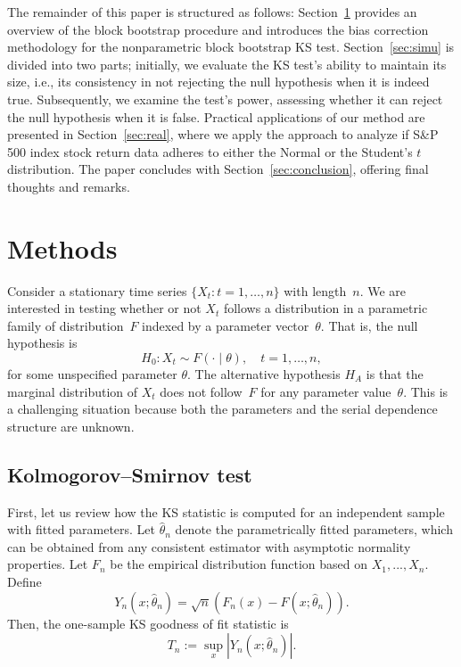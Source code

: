\documentclass[APA,Times1COL]{WileyNJDv5} %
\begin{document}
The remainder of this paper is structured as follows: 
Section~\ref{sec:methods} provides an overview of the block bootstrap 
procedure and introduces the bias correction methodology for the 
nonparametric block bootstrap KS test. Section~\ref{sec:simu} is divided 
into two parts; initially, we evaluate the KS test's ability to maintain 
its size, i.e., its consistency in not rejecting the null hypothesis when 
it is indeed true. Subsequently, we examine the test's power, assessing 
whether it can reject the null hypothesis when it is false. Practical 
applications of our method are presented in Section~\ref{sec:real}, where 
we apply the approach to analyze if S\&P 500 index stock return
data adheres to either the Normal or the Student's $t$ distribution. The 
paper concludes with Section~\ref{sec:conclusion}, offering final thoughts
and remarks.


\section{Methods}\label{sec:methods}

Consider a stationary time series $\{X_t: t = 1, \ldots, n\}$ with length~$n$.
We are interested in testing whether or not $X_t$ follows a distribution in a
parametric family of distribution~$F$ indexed by a parameter
vector~$\theta$. That is, the null hypothesis is
\[
  H_0: X_t \sim F(\cdot \mid \theta), \quad t = 1, \ldots, n,
\]
for some unspecified parameter $\theta$.
The alternative hypothesis $H_A$ is that the marginal distribution of $X_t$ does
not follow~$F$ for any parameter value~$\theta$. This is a challenging situation
because both the parameters and the serial dependence structure are unknown.

\subsection{Kolmogorov--Smirnov test}

First, let us review how the KS statistic is computed for an independent
sample with fitted parameters. Let $\hat\theta_n$ denote the parametrically
fitted parameters, which can be obtained from any consistent estimator with
asymptotic normality properties.  Let $F_n$ be the empirical distribution
function based on $X_1,...,X_n$.
Define 
\begin{equation*}
Y_n(x; \hat\theta_n) = \sqrt{n}(F_n(x) - F(x; \hat\theta_n)).
\end{equation*}
Then, the one-sample KS goodness of fit statistic is 
\begin{equation*}
T_n := \sup_x|Y_n(x; \hat\theta_n)|.
\end{equation*}
\end{document}
